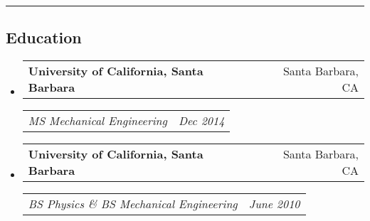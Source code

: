 \documentclass[10pt,letterpaper]{article}
\makeatletter
\newcommand{\headerrow}[2]{
\begin{tabular*}{\linewidth}{l@{\extracolsep{\fill}}r}
		#1 &
		#2 \\
	\end{tabular*}
}
\newcommand{\jobitem}[4]{\item \headerrow{\textbf{#1}}{#2}
\headerrow{\emph{#3}}{\emph{#4}}}
\makeatother
\begin{document}
\hrule
\subsection*{Education}
\begin{itemize}
	\jobitem{University of California, Santa Barbara}{Santa Barbara, CA}
		    {MS  Mechanical Engineering}{Dec 2014}
	\jobitem{University of California, Santa Barbara}{Santa Barbara, CA}	
		    {BS Physics \&  BS Mechanical Engineering}{June 2010}
\end{itemize}
\end{document}
